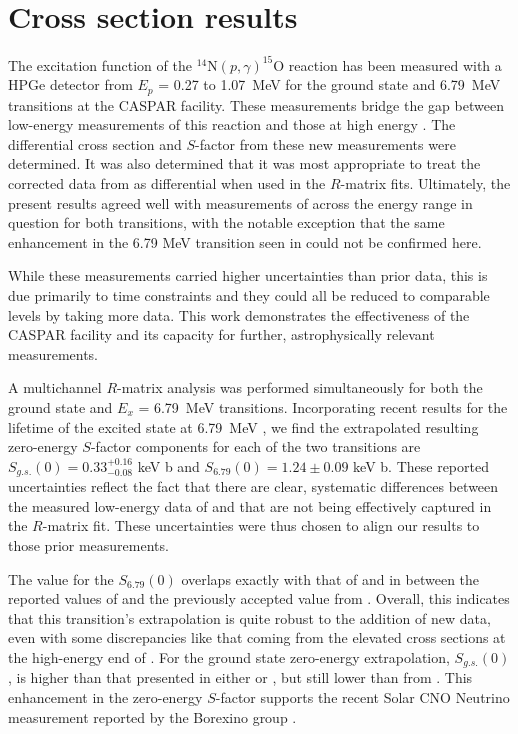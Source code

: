 \section{Cross section results}
\label{sec: csResults}

The excitation function of the $^{14}$N$(p,\gamma)^{15}$O reaction has been measured with a HPGe detector from $E_{p}$ = 0.27 to 1.07~MeV for the ground state and 6.79~MeV transitions at the CASPAR facility. These measurements bridge the gap between low-energy measurements of this reaction \cite{Formicola2004, Imbriani2005, Marta2008, Marta2011, Runkle2005} and those at high energy \cite{Schroder1987, Li2016}. The differential cross section and $S$-factor from these new measurements were determined. It was also determined that it was most appropriate to treat the corrected data from \cite{Schroder1987} as differential when used in the $R$-matrix fits. Ultimately, the present results agreed well with measurements of \cite{Schroder1987, Imbriani2005, Runkle2005, Marta2011, Li2016, Wagner2018} across the energy range in question for both transitions, with the notable exception that the same enhancement in the 6.79 MeV transition seen in \citet{Wagner2018} could not be confirmed here. 

While these measurements carried higher uncertainties than prior data, this is due primarily to time constraints and they could all be reduced to comparable levels by taking more data. This work demonstrates the effectiveness of the CASPAR facility and its capacity for further, astrophysically relevant measurements. 

A multichannel $R$-matrix analysis was performed simultaneously for both the ground state and $E_x$ = 6.79~MeV transitions. Incorporating recent results for the lifetime of the excited state at 6.79~MeV \cite{Frentz2021}, we find the extrapolated resulting zero-energy $S$-factor components for each of the two transitions are $S_{g.s.}(0) = 0.33_{-0.08}^{+0.16}$ keV b and $S_{6.79}(0) = 1.24 \pm 0.09 $ keV b. These reported uncertainties reflect the fact that there are clear, systematic differences between the measured low-energy data of \citet{Imbriani2005} and \citet{Runkle2005} that are not being effectively captured in the $R$-matrix fit. These uncertainties were thus chosen to align our results to those prior measurements. 

The value for the $S_{6.79}(0)$ overlaps exactly with that of \citet{Wagner2018} and in between the reported values of \citet{Li2016} and the previously accepted value from \citet{Adelberger2011}. Overall, this indicates that this transition's extrapolation is quite robust to the addition of new data, even with some discrepancies like that coming from the elevated cross sections at the high-energy end of \citet{Wagner2018}. For the ground state zero-energy extrapolation, $S_{g.s.}(0)$, is higher than that presented in either \citet{Wagner2018} or \citet{Adelberger2011}, but still lower than from \citet{Li2016}. This enhancement in the zero-energy $S$-factor supports the recent Solar CNO Neutrino measurement reported by the Borexino group \cite{agostini2020direct}.


